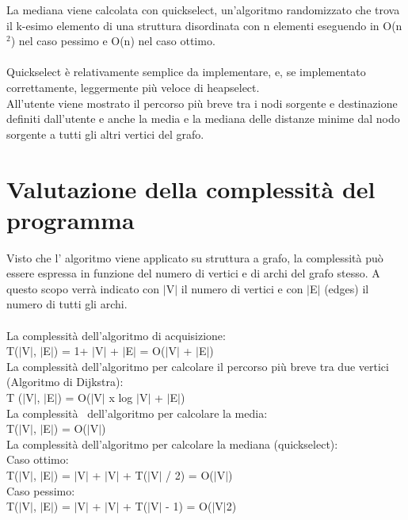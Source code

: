 \documentclass[11pt, a4paper, titlepage, block]{article}
\begin{document}
La mediana viene calcolata con quickselect, un'algoritmo randomizzato che trova il k-esimo elemento di una struttura disordinata con n elementi eseguendo in O(n$^2$) nel caso pessimo e O(n) nel caso ottimo.\\\\ 

Quickselect \`{e} relativamente semplice da implementare, e, se implementato correttamente, leggermente pi\`{u} veloce di heapselect.\\
All'utente viene mostrato il percorso pi\`{u} breve tra i nodi sorgente e destinazione definiti dall'utente e anche la media e la mediana delle distanze minime dal nodo sorgente a tutti gli altri vertici del grafo.
	\newpage
\section{Valutazione della complessit\`{a} del programma}
Visto che l' algoritmo viene applicato su struttura a grafo, la complessit\`{a} pu\`{o} essere espressa in 
funzione del numero di vertici e di archi del grafo stesso. A questo scopo verr\`{a} indicato con $|$V$|$ il 
numero di vertici e con $|$E$|$ (edges) il numero di tutti gli archi.\\
\\
La complessit\`{a} dell'algoritmo di acquisizione:\\
\indent T($|$V$|$, $|$E$|$) = 1+ $|$V$|$ + $|$E$|$ = O($|$V$|$ + $|$E$|$)\\
La complessit\`{a} dell'algoritmo per calcolare il percorso pi\`{u} breve tra due vertici (Algoritmo di Dijkstra):\\
\indent T ($|$V$|$, $|$E$|$) = O($|$V$|$ x log $|$V$|$ + $|$E$|$)\\
La complessit\`{a}  dell'algoritmo per calcolare la media:\\
\indent T($|$V$|$, $|$E$|$) = O($|$V$|$)\\
La complessit\`{a} dell'algoritmo per calcolare la mediana (quickselect):\\
\indent Caso ottimo:\\
\indent \indent T($|$V$|$, $|$E$|$) = $|$V$|$ + $|$V$|$ + T($|$V$|$ / 2) = O($|$V$|$)\\
\indent Caso pessimo:\\
\indent \indent T($|$V$|$, $|$E$|$) = $|$V$|$ + $|$V$|$ + T($|$V$|$ - 1) = O($|$V$|$2)\\
	\newpage
\end{document}
